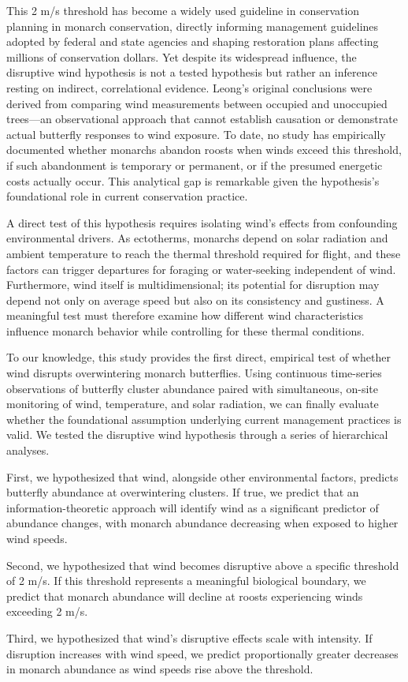 This 2 m/s threshold has become a widely used guideline in conservation planning in monarch conservation, directly informing management guidelines adopted by federal and state agencies and shaping restoration plans affecting millions of conservation dollars. Yet despite its widespread influence, the disruptive wind hypothesis is not a tested hypothesis but rather an inference resting on indirect, correlational evidence. Leong's original conclusions were derived from comparing wind measurements between occupied and unoccupied trees---an observational approach that cannot establish causation or demonstrate actual butterfly responses to wind exposure. To date, no study has empirically documented whether monarchs abandon roosts when winds exceed this threshold, if such abandonment is temporary or permanent, or if the presumed energetic costs actually occur. This analytical gap is remarkable given the hypothesis's foundational role in current conservation practice.

A direct test of this hypothesis requires isolating wind's effects from confounding environmental drivers. As ectotherms, monarchs depend on solar radiation and ambient temperature to reach the thermal threshold required for flight, and these factors can trigger departures for foraging or water-seeking independent of wind. Furthermore, wind itself is multidimensional; its potential for disruption may depend not only on average speed but also on its consistency and gustiness. A meaningful test must therefore examine how different wind characteristics influence monarch behavior while controlling for these thermal conditions.

To our knowledge, this study provides the first direct, empirical test of whether wind disrupts overwintering monarch butterflies. Using continuous time-series observations of butterfly cluster abundance paired with simultaneous, on-site monitoring of wind, temperature, and solar radiation, we can finally evaluate whether the foundational assumption underlying current management practices is valid. We tested the disruptive wind hypothesis through a series of hierarchical analyses.

First, we hypothesized that wind, alongside other environmental factors, predicts butterfly abundance at overwintering clusters. If true, we predict that an information-theoretic approach will identify wind as a significant predictor of abundance changes, with monarch abundance decreasing when exposed to higher wind speeds.

Second, we hypothesized that wind becomes disruptive above a specific threshold of 2 m/s. If this threshold represents a meaningful biological boundary, we predict that monarch abundance will decline at roosts experiencing winds exceeding 2 m/s.

Third, we hypothesized that wind's disruptive effects scale with intensity. If disruption increases with wind speed, we predict proportionally greater decreases in monarch abundance as wind speeds rise above the threshold.
